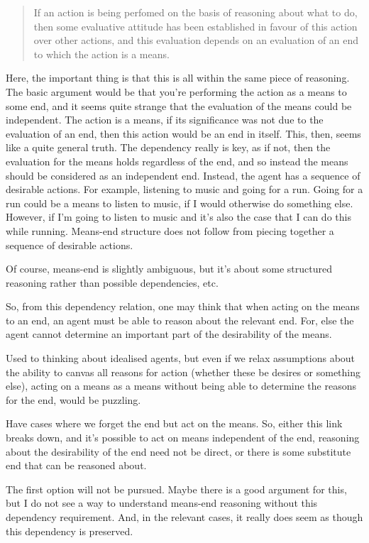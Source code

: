 \documentclass[10pt]{article}
\begin{document}
\begin{quote}
  If an action is being perfomed on the basis of reasoning about what to do, then some evaluative attitude has been established in favour of this action over other actions, and this evaluation depends on an evaluation of an end to which the action is a means.
\end{quote}
Here, the important thing is that this is all within the same piece of reasoning.
The basic argument would be that you're performing the action as a means to some end, and it seems quite strange that the evaluation of the means could be independent.
The action is a means, if its significance was not due to the evaluation of an end, then this action would be an end in itself.
This, then, seems like a quite general truth.
The dependency really is key, as if not, then the evaluation for the means holds regardless of the end, and so instead the means should be considered as an independent end.
Instead, the agent has a sequence of desirable actions.
For example, listening to music and going for a run.
Going for a run could be a means to listen to music, if I would otherwise do something else.
However, if I'm going to listen to music and it's also the case that I can do this while running.
Means-end structure does not follow from piecing together a sequence of desirable actions.

Of course, means-end is slightly ambiguous, but it's about some structured reasoning rather than possible dependencies, etc.

So, from this dependency relation, one may think that when acting on the means to an end, an agent must be able to reason about the relevant end.
For, else the agent cannot determine an important part of the desirability of the means.

Used to thinking about idealised agents, but even if we relax assumptions about the ability to canvas all reasons for action (whether these be desires or something else), acting on a means as a means without being able to determine the reasons for the end, would be puzzling.

Have cases where we forget the end but act on the means.
So, either this link breaks down, and it's possible to act on means independent of the end, reasoning about the desirability of the end need not be direct, or there is some substitute end that can be reasoned about.

The first option will not be pursued.
Maybe there is a good argument for this, but I do not see a way to understand means-end reasoning without this dependency requirement.
And, in the relevant cases, it really does seem as though this dependency is preserved.
\end{document}
